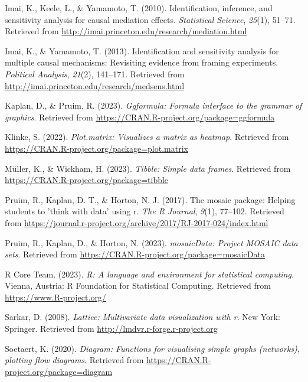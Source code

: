 \documentclass[
  man,floatsintext]{apa6}
\newlength{\cslhangindent}
\newlength{\cslentryspacingunit} %
\newenvironment{CSLReferences}[2] %
 {%
  \setlength{\parindent}{0pt}
  \ifodd #1
  \let\oldpar\par
  \def\par{\hangindent=\cslhangindent\oldpar}
  \fi
  \setlength{\parskip}{#2\cslentryspacingunit}
 }%
 {}
\begin{document}
\begin{CSLReferences}{1}{0}
\leavevmode{}%
Imai, K., Keele, L., \& Yamamoto, T. (2010). Identification, inference, and sensitivity analysis for causal mediation effects. \emph{Statistical Science}, \emph{25}(1), 51--71. Retrieved from \url{http://imai.princeton.edu/research/mediation.html}

\leavevmode{}%
Imai, K., \& Yamamoto, T. (2013). Identification and sensitivity analysis for multiple causal mechanisms: Revisiting evidence from framing experiments. \emph{Political Analysis}, \emph{21}(2), 141--171. Retrieved from \url{http://imai.princeton.edu/research/medsens.html}

\leavevmode{}%
Kaplan, D., \& Pruim, R. (2023). \emph{Ggformula: Formula interface to the grammar of graphics}. Retrieved from \url{https://CRAN.R-project.org/package=ggformula}

\leavevmode{}%
Klinke, S. (2022). \emph{Plot.matrix: Visualizes a matrix as heatmap}. Retrieved from \url{https://CRAN.R-project.org/package=plot.matrix}

\leavevmode{}%
Müller, K., \& Wickham, H. (2023). \emph{Tibble: Simple data frames}. Retrieved from \url{https://CRAN.R-project.org/package=tibble}

\leavevmode{}%
Pruim, R., Kaplan, D. T., \& Horton, N. J. (2017). The mosaic package: Helping students to 'think with data' using r. \emph{The R Journal}, \emph{9}(1), 77--102. Retrieved from \url{https://journal.r-project.org/archive/2017/RJ-2017-024/index.html}

\leavevmode{}%
Pruim, R., Kaplan, D., \& Horton, N. (2023). \emph{mosaicData: Project MOSAIC data sets}. Retrieved from \url{https://CRAN.R-project.org/package=mosaicData}

\leavevmode{}%
R Core Team. (2023). \emph{R: A language and environment for statistical computing}. Vienna, Austria: R Foundation for Statistical Computing. Retrieved from \url{https://www.R-project.org/}

\leavevmode{}%
Sarkar, D. (2008). \emph{Lattice: Multivariate data visualization with r}. New York: Springer. Retrieved from \url{http://lmdvr.r-forge.r-project.org}

\leavevmode{}%
Soetaert, K. (2020). \emph{Diagram: Functions for visualising simple graphs (networks), plotting flow diagrams}. Retrieved from \url{https://CRAN.R-project.org/package=diagram}


\end{CSLReferences}
\end{document}
